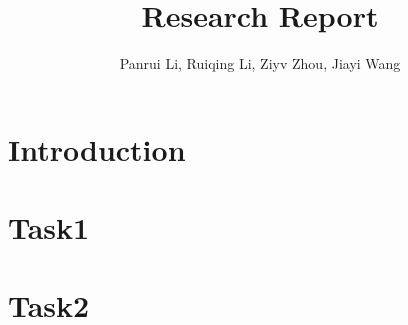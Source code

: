 \documentclass[a4paper,journal]{IEEEtran}
\begin{document}
\title{Research Report}
\author{Panrui Li, Ruiqing Li, Ziyv Zhou, Jiayi Wang}

\maketitle

\begin{abstract}

\end{abstract}



\section{Introduction}
\cite{lheeBufferOverflowFormat2003}
\section{Task1}
\subsection{}

\section{Task2}

\newpage


\end{document}
